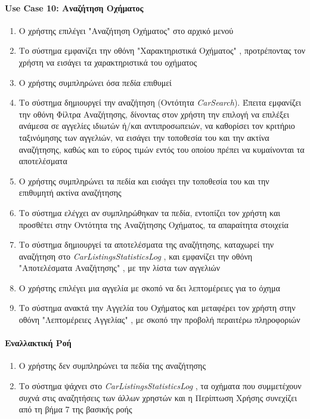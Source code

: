 \documentclass{../ol-softwaremanual}
\begin{document}
	\paragraph{\en Use Case 10: \gr Αναζήτηση Οχήματος}  
	\begin{enumerate}
		\item Ο χρήστης επιλέγει \en"\gr Αναζήτηση Οχήματος\en" \gr στο αρχικό μενού
		\item Το σύστημα εμφανίζει την οθόνη \en"\gr Χαρακτηριστικά Οχήματος\en" \gr, προτρέποντας τον χρήστη να εισάγει τα χαρακτηριστικά του οχήματος 
		\item Ο χρήστης συμπληρώνει όσα πεδία επιθυμεί
		\item Το σύστημα δημιουργεί την αναζήτηση (Οντότητα \en \textit{CarSearch}\gr). Έπειτα εμφανίζει την οθόνη Φίλτρα Αναζήτησης, δίνοντας στον χρήστη την επιλογή να επιλέξει ανάμεσα σε αγγελίες ιδιωτών ή/και αντιπροσωπειών, να καθορίσει τον κριτήριο ταξινόμησης των αγγελιών, να εισάγει την τοποθεσία του και την ακτίνα αναζήτησης, καθώς και το εύρος τιμών εντός του οποίου πρέπει να κυμαίνονται τα αποτελέσματα
		\item Ο χρήστης συμπληρώνει τα πεδία και εισάγει την τοποθεσία του και την επιθυμητή ακτίνα αναζήτησης
		\item Το σύστημα ελέγχει αν συμπληρώθηκαν τα πεδία, εντοπίζει τον χρήστη και προσθέτει στην Οντότητα της Αναζήτησης Οχήματος, τα απαραίτητα στοιχεία
		\item Το σύστημα δημιουργεί τα αποτελέσματα της αναζήτησης, καταχωρεί την αναζήτηση στο \en \textit{CarListingsStatisticsLog} \gr, και εμφανίζει την οθόνη \en"\gr Αποτελέσματα Αναζήτησης\en" \gr, με την λίστα των αγγελιών 
		\item Ο χρήστης επιλέγει μια αγγελία με σκοπό να δει λεπτομέρειες για το όχημα
		\item Το σύστημα ανακτά την Αγγελία του Οχήματος και μεταφέρει τον χρήστη στην οθόνη \en"\gr Λεπτομέρειες Αγγελίας\en" \gr, με σκοπό την προβολή περαιτέρω πληροφοριών	
	\end{enumerate}
	
	
	\paragraph{Εναλλακτική Ροή}
	\begin{enumerate}
		\item Ο χρήστης δεν συμπληρώνει τα πεδία της αναζήτησης
		\item Το σύστημα ψάχνει στο \en \textit{CarListingsStatisticsLog} \gr, τα οχήματα που συμμετέχουν συχνά στις αναζητήσεις των άλλων χρηστών και η Περίπτωση Χρήσης συνεχίζει από τη βήμα 7 της βασικής ροής
	\end{enumerate}
	
\end{document}

